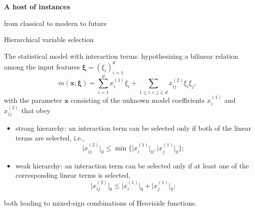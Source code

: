 \documentclass[aspectratio=169,xcolor=dvipsnames]{beamer}
\begin{document}
\begin{frame}[plain]
  \centering
  \vfill
  {\Large\bfseries A host of instances\par}
  \vspace{0.26cm}
  {\normalsize\mdseries
    from classical to modern to future\par}
  \vfill
\end{frame}

\begin{frame}{Hierarchical variable selection}
  \small
  \setlength{\abovedisplayskip}{4pt}
  \setlength{\belowdisplayskip}{4pt}
  \setlength{\abovedisplayshortskip}{3pt}
  \setlength{\belowdisplayshortskip}{3pt}

  The statistical model with interaction terms: hypothesizing a bilinear
  relation among the input features
  $\boldsymbol{\xi}=(\xi_i)_{i=1}^{d}$
  \[
    m(\mathbf{x};\boldsymbol{\xi})
    =\sum_{i=1}^{d}x_i^{(1)}\xi_i
    +\sum_{1\leq i<j\leq d}x_{ij}^{(2)}\xi_i\xi_j,
  \]
  with the parameter $\mathbf{x}$ consisting of the unknown model
  coefficients $x_i^{(1)}$ and $x_{ij}^{(2)}$ that obey

  \begin{itemize}
    \setlength{\itemsep}{0.08cm}
    \item {\color{MediumBlue}strong hierarchy}: an interaction term can be
      selected only if both of the linear terms are selected, i.e.,
      \[
        \bigl|x_{ij}^{(2)}\bigr|_0\leq
        \min\bigl\{\bigl|x_i^{(1)}\bigr|_0,\bigl|x_j^{(1)}\bigr|_0\bigr\};
      \]
    \item {\color{MediumBlue}weak hierarchy}: an interaction term can be
      selected only if at least one of the corresponding linear terms is
      selected,
      \[
        \bigl|x_{ij}^{(2)}\bigr|_0\leq
        \bigl|x_i^{(1)}\bigr|_0+\bigl|x_j^{(1)}\bigr|_0;
      \]
  \end{itemize}

  both leading to \textcolor{MediumRed}{mixed-sign} combinations of
  Heaviside functions.
\end{frame}
\end{document}
